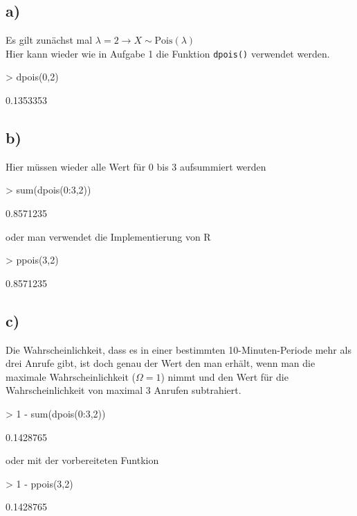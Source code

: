 \subsection*{a)}
Es gilt zunächst mal $\lambda = 2 \rightarrow X \sim \text{Pois}(\lambda)$\\

\noindent
Hier kann wieder wie in Aufgabe 1 die Funktion \verb!dpois()! verwendet 
werden.
\begin{Schunk}
\begin{Sinput}
> dpois(0,2)
\end{Sinput}
\begin{Soutput}
[1] 0.1353353
\end{Soutput}
\end{Schunk}

\subsection*{b)}
Hier müssen wieder alle Wert für $0$ bis $3$ aufsummiert werden
\begin{Schunk}
\begin{Sinput}
> sum(dpois(0:3,2))
\end{Sinput}
\begin{Soutput}
[1] 0.8571235
\end{Soutput}
\end{Schunk}
oder man verwendet die Implementierung von R 
\begin{Schunk}
\begin{Sinput}
> ppois(3,2)
\end{Sinput}
\begin{Soutput}
[1] 0.8571235
\end{Soutput}
\end{Schunk}

\subsection*{c)}
Die Wahrscheinlichkeit, dass es in einer bestimmten 10-Minuten-Periode
mehr als drei Anrufe gibt, ist doch genau der Wert den man erhält, wenn
man die maximale Wahrscheinlichkeit ($\Omega = 1$) nimmt und den Wert für 
die Wahrscheinlichkeit von maximal $3$ Anrufen subtrahiert.
\begin{Schunk}
\begin{Sinput}
> 1 - sum(dpois(0:3,2))
\end{Sinput}
\begin{Soutput}
[1] 0.1428765
\end{Soutput}
\end{Schunk}
oder mit der vorbereiteten Funtkion
\begin{Schunk}
\begin{Sinput}
> 1 - ppois(3,2)
\end{Sinput}
\begin{Soutput}
[1] 0.1428765
\end{Soutput}
\end{Schunk}

